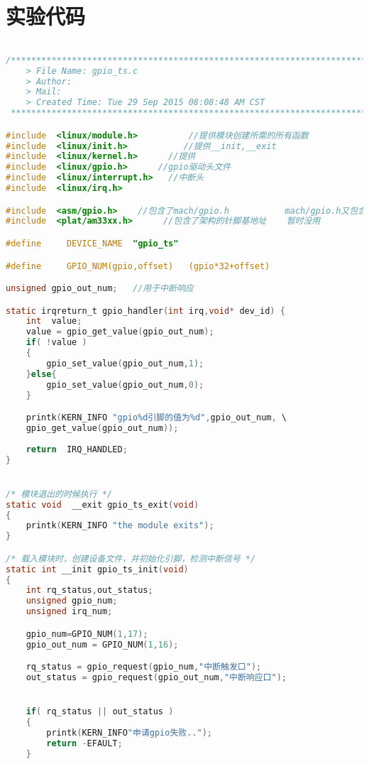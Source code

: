 \documentclass[a4paper,10.5pt]{article}
\begin{document}
    \section{实验代码}
    \begin{lstlisting}[language=C]

/*************************************************************************
	> File Name: gpio_ts.c
	> Author: 
	> Mail: 
	> Created Time: Tue 29 Sep 2015 08:08:48 AM CST
 ************************************************************************/

#include  <linux/module.h>          //提供模块创建所需的所有函数
#include  <linux/init.h>           //提供__init,__exit
#include  <linux/kernel.h>      //提供
#include  <linux/gpio.h>      //gpio驱动头文件
#include  <linux/interrupt.h>   //中断头
#include  <linux/irq.h>

#include  <asm/gpio.h>    //包含了mach/gpio.h           mach/gpio.h又包含了plat/gpio.h
#include  <plat/am33xx.h>      //包含了架构的针脚基地址    暂时没用

#define     DEVICE_NAME  "gpio_ts"

#define     GPIO_NUM(gpio,offset)   (gpio*32+offset)

unsigned gpio_out_num;   //用于中断响应

static irqreturn_t gpio_handler(int irq,void* dev_id) { 
    int  value;
    value = gpio_get_value(gpio_out_num);
    if( !value )
    {
        gpio_set_value(gpio_out_num,1); 
    }else{
        gpio_set_value(gpio_out_num,0);
    }

    printk(KERN_INFO "gpio%d引脚的值为%d",gpio_out_num, \
    gpio_get_value(gpio_out_num));
    
    return  IRQ_HANDLED;
}


/* 模块退出的时候执行 */
static void  __exit gpio_ts_exit(void)
{
    printk(KERN_INFO "the module exits");
}

/* 载入模块时，创建设备文件，并初始化引脚，检测中断信号 */
static int __init gpio_ts_init(void)
{
    int rq_status,out_status;
    unsigned gpio_num;  
    unsigned irq_num;

    gpio_num=GPIO_NUM(1,17);     
    gpio_out_num = GPIO_NUM(1,16);   

    rq_status = gpio_request(gpio_num,"中断触发口"); 
    out_status = gpio_request(gpio_out_num,"中断响应口");


    if( rq_status || out_status )
    {
        printk(KERN_INFO"申请gpio失败..");
        return -EFAULT;
    }


\end{lstlisting}
\end{document}
